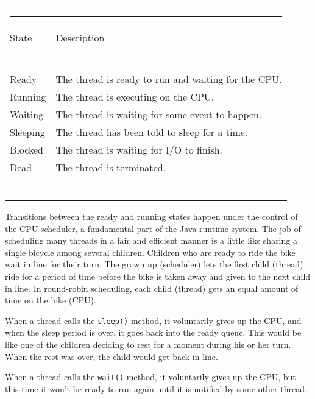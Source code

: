 \begin{table}[t]
\hspace*{2pc}\begin{tabular}{ll}
\multicolumn{2}{l}{\color{cyan}\rule{22pc}{1pt}}\\[2pt]
{State} & {Description}
\\[-4pt]\multicolumn{2}{l}{\color{cyan}\rule{22pc}{0.5pt}}\\[2pt]
Ready      & The thread is ready to run and waiting for the CPU.\\[2pt]
Running    & The thread is executing on the CPU.\\[2pt]
Waiting    & The thread is waiting for some event to happen.\\[2pt]
Sleeping   & The thread has been told to sleep for a time.\\[2pt]
Blocked    & The thread is waiting for I/O to finish.\\[2pt]
Dead       & The thread is terminated.
\\[-4pt]\multicolumn{2}{l}{\color{cyan}\rule{22pc}{1pt}}
\end{tabular}
\endTB
\end{table}

Transitions between the ready and running states happen under the
control of the CPU scheduler, a fundamental part of the Java runtime
system.  The job of scheduling many threads in a fair and
efficient manner is a little like sharing a single bicycle among
several children.   Children who are ready to ride the bike wait in line
for their turn.  The grown up (scheduler) lets the first child (thread)
ride for a period of time before the bike is taken away and given to
the next child in line.  In round-robin scheduling, each child (thread)
gets an equal amount of time on the bike (CPU).

When a thread calls the {\tt sleep()} method, it voluntarily gives up
the CPU, and when the sleep period is over, it goes back into the
ready queue.   This would be like one of the children deciding to rest
for a moment during his or her turn.   When the rest was over, the
child would get back in line.

When a thread calls the {\tt wait()} method, it voluntarily gives up
the CPU, but this time it won't be ready to run again until it is
notified by some other thread.


